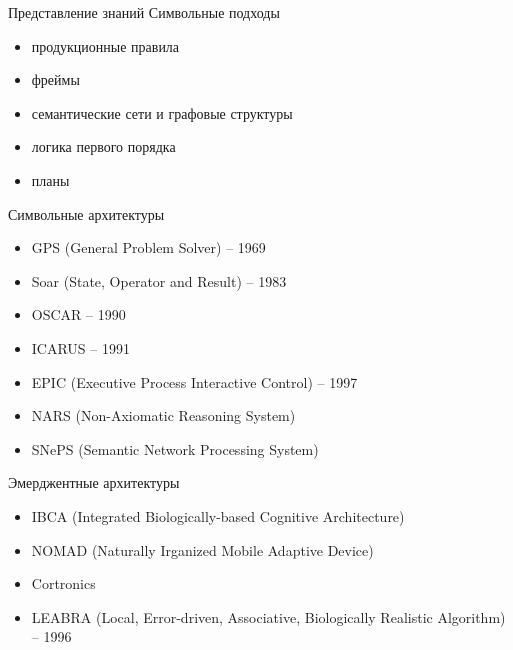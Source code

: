 \documentclass{beamer}
\begin{document}
\begin{frame}{Представление знаний}
Символьные подходы\\
\medskip
\begin{itemize}
	\item продукционные правила
	\item фреймы
	\item семантические сети и графовые структуры
	\item логика первого порядка
	\item планы
	\medskip
\end{itemize}
\end{frame}

\begin{frame}{Символьные архитектуры}
\begin{itemize}
    \item GPS (General Problem Solver) -- 1969
	\item Soar (State, Operator and Result) -- 1983
	\item OSCAR -- 1990
	\item ICARUS -- 1991
	\item EPIC (Executive Process Interactive Control) -- 1997
	\item NARS (Non-Axiomatic Reasoning System)
	\item SNePS (Semantic Network Processing System)
\end{itemize}
\end{frame}

\begin{frame}{Эмерджентные архитектуры}
\begin{itemize}
	\item IBCA (Integrated Biologically-based Cognitive Architecture)
	\item NOMAD (Naturally Irganized Mobile Adaptive Device)
	\item Cortronics
	\item LEABRA (Local, Error-driven, Associative, Biologically Realistic Algorithm) -- 1996
\end{itemize}
\end{frame}
\end{document}
